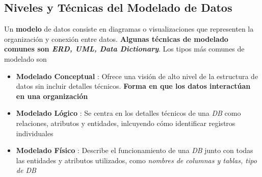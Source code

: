 \subsection{Niveles y Técnicas del Modelado de Datos}
Un \textbf{modelo} de datos consiste en diagramas o visualizaciones que representen la organización y conexión entre datos. \textbf{Algunas técnicas de modelado comunes son \textit{ERD, UML, Data Dictionary}}. Los tipos más comunes de modelado son 
\begin{itemize}
    \item {\textbf{Modelado Conceptual} : Ofrece una visión de alto nivel de la estructura de datos sin incluir detalles técnicos. \textbf{Forma en que los datos interactúan en una organización}}
    \item {\textbf{Modelado Lógico} : Se centra en los detalles técnicos de una \textit{DB} como relaciones, atributos y entidades, inlcuyendo cómo identificar registros individuales}
    \item {\textbf{Modelado Físico} : Describe el funcionamiento de una \textit{DB} junto con todas las entidades y atributos utilizados, como \textit{ nombres de columnas y tablas, tipo de DB}} 
\end{itemize}


